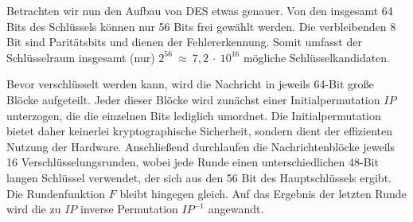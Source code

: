 Betrachten wir nun den Aufbau von DES etwas genauer. Von den insgesamt 64 Bits des Schlüssels können nur 56 Bits frei gewählt werden. Die verbleibenden 8 Bit sind Paritätsbits und dienen der Fehlererkennung. Somit umfasst der Schlüsselraum insgesamt (nur) $2^{56}~\approx~7,2~\cdot~10^{16}$ mögliche Schlüsselkandidaten.

Bevor verschlüsselt werden kann, wird die Nachricht in jeweils 64-Bit große Blöcke aufgeteilt. Jeder dieser Blöcke wird zunächst einer Initialpermutation $IP$ unterzogen, die die einzelnen Bits lediglich umordnet. Die Initialpermutation bietet daher keinerlei kryptographische Sicherheit, sondern dient der effizienten Nutzung der Hardware. Anschließend durchlaufen die Nachrichtenblöcke jeweils 16 Verschlüsselungsrunden, wobei jede Runde  einen unterschiedlichen 48-Bit langen Schlüssel verwendet, der sich aus den 56 Bit des Hauptschlüssels ergibt. Die Rundenfunktion $F$ bleibt hingegen gleich. Auf das Ergebnis der letzten Runde wird die zu $IP$ inverse Permutation $IP^{-1}$ angewandt.

